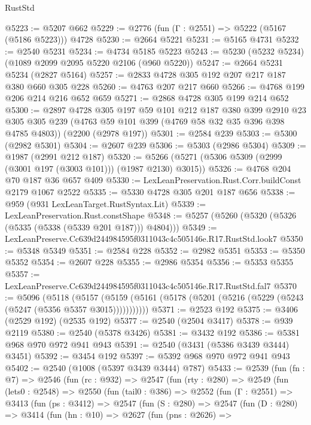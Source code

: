 \begin{lexlean}{RustStd}
\begin{coremodule}
@5223 := @5207 @662
@5229 := @2776 (fun (Γ : @2551) => @5222 (@5167 (@5186 @5223))) @4728
@5230 := @2664 @5221
@5231 := @5165 @4731
@5232 := @2540 @5231
@5234 := @4734 @5185 @5223
@5243 := @5230 (@5232 @5234) (@1089 @2099 @2095 @5220 @2106 (@960 @5220))
@5247 := @2664 @5231 @5234 (@2827 @5164)
@5257 := @2833 @4728 @305 @192 @207 @217 @187 @380 @660 @305 @228
@5260 := @4763 @207 @217 @660
@5266 := @4768 @199 @206 @214 @216 @652 @659
@5271 := @2868 @4728 @305 @199 @214 @652
@5300 := @2897
    @4728
    @305
    @197
    @59
    @101
    @212
    @187
    @380
    @399
    @2910
    @23
    @305
    @305
    @239
    (@4763 @59 @101 @399 (@4769 @58 @32 @35 @396 @398 @4785 @4803))
    (@2200 (@2978 @197))
@5301 := @2584 @239
@5303 := @5300 (@2982 @5301)
@5304 := @2607 @239
@5306 := @5303 (@2986 @5304)
@5309 := @1987 (@2991 @212 @187)
@5320 := @5266 (@5271 (@5306 @5309 (@2999 (@3001 @197 (@3003 @101))) (@1987 @2130) @3015))
@5326 := @4768 @204 @70 @187 @36 @657 @409
@5330 := LexLeanPreservation.Rust.Corr.buildConst @2179 @1067 @2522
@5335 := @5330 @4728 @305 @201 @187 @656
@5338 := @959 (@931 LexLeanTarget.RustSyntax.Lit)
@5339 := LexLeanPreservation.Rust.constShape
@5348 := @5257 (@5260 (@5320 (@5326 (@5335 (@5338 (@5339 @201 @187))) @4804)))
@5349 := LexLeanPreserve.Cc639d244984595f0311043c4c505146e.R17.RustStd.look7
@5350 := @5348 @5349
@5351 := @2584 @228
@5352 := @2982 @5351
@5353 := @5350 @5352
@5354 := @2607 @228
@5355 := @2986 @5354
@5356 := @5353 @5355
@5357 := LexLeanPreserve.Cc639d244984595f0311043c4c505146e.R17.RustStd.fal7
@5370 := @5096
    (@5118
      (@5157 (@5159 (@5161 (@5178 (@5201 (@5216 (@5229 (@5243 (@5247 (@5356 @5357 @3015)))))))))))
@5371 := @2523 @192
@5375 := @3406 (@2529 @192) (@2535 @192)
@5377 := @2540 (@2504 @3417)
@5378 := @939 @2119
@5380 := @2540 (@5378 @3426)
@5381 := @3432 @192
@5386 := @5381 @968 @970 @972 @941 @943
@5391 := @2540 (@3431 (@5386 @3439 @3444) @3451)
@5392 := @3454 @192
@5397 := @5392 @968 @970 @972 @941 @943
@5402 := @2540 (@1008 (@5397 @3439 @3444) @787)
@5433 := @2539
    (fun (fn : @7) =>
    @2546
      (fun (rc : @932) =>
      @2547
        (fun (rty : @280) =>
        @2549
          (fun (lets0 : @2548) =>
          @2550
            (fun (tail0 : @386) =>
            @2552
              (fun (Γ : @2551) =>
              @3413
                (fun (ps : @3412) =>
                @2547
                  (fun (S : @280) =>
                  @2547
                    (fun (D : @280) =>
                    @3414
                      (fun (hn : @10) =>
                      @2627
                        (fun (pns : @2626) =>

\end{coremodule}
\end{lexlean}
